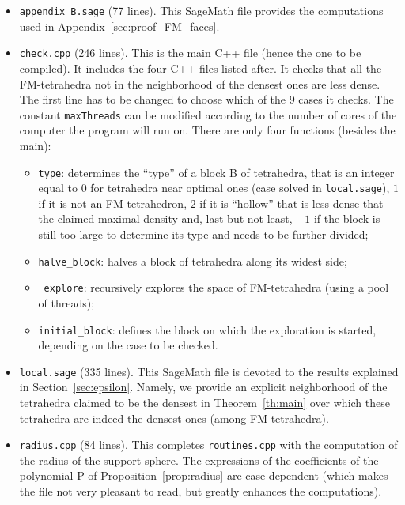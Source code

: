 \documentclass[11pt]{article}
\begin{document}
\begin{itemize}

\item \verb+appendix_B.sage+ (77 lines).
This SageMath file provides the computations used in Appendix~\ref{sec:proof_FM_faces}.

\item \verb+check.cpp+ (246 lines).
This is the main C++ file (hence the one to be compiled).
It includes the four C++ files listed after.
It checks that all the FM-tetrahedra not in the neighborhood of the densest ones are less dense.
The first line has to be changed to choose which of the $9$ cases it checks.
The constant \verb+maxThreads+ can be modified according to the number of cores of the computer the program will run on.
There are only four functions (besides the main):
\begin{itemize}
\item \verb+type+: determines the ``type'' of a block B of tetrahedra, that is an integer equal to $0$ for tetrahedra near optimal ones (case solved in \verb+local.sage+), $1$ if it is not an FM-tetrahedron, $2$ if it is ``hollow'' that is less dense that the claimed maximal density and, last but not least, $-1$ if the block is still too large to determine its type and needs to be further divided;
\item \verb+halve_block+: halves a block of tetrahedra along its widest side;
\item \verb+explore+: recursively explores the space of FM-tetrahedra (using a pool of threads);
\item \verb+initial_block+: defines the block on which the exploration is started, depending on the case to be checked.
\end{itemize}

\item \verb+local.sage+ (335 lines).
This SageMath file is devoted to the results explained in Section~\ref{sec:epsilon}.
Namely, we provide an explicit neighborhood of the tetrahedra claimed to be the densest in Theorem~\ref{th:main} over which these tetrahedra are indeed the densest ones (among FM-tetrahedra).

\item \verb+radius.cpp+ (84 lines).
This completes \verb+routines.cpp+ with the computation of the radius of the support sphere.
The expressions of the coefficients of the polynomial P of Proposition~\ref{prop:radius} are case-dependent (which makes the file not very pleasant to read, but greatly enhances the computations).


\end{itemize}
\end{document}

